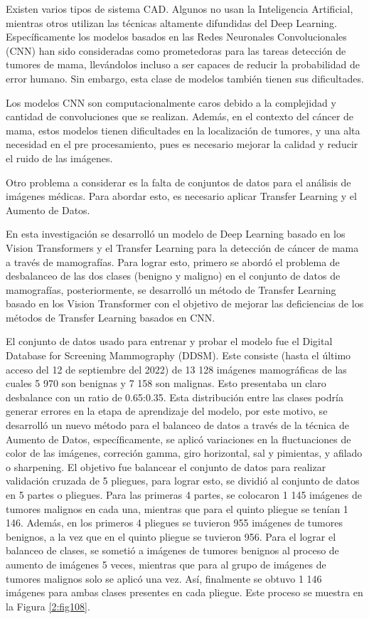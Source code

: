 Existen varios tipos de sistema CAD. Algunos no usan la Inteligencia Artificial, mientras otros utilizan las técnicas altamente difundidas del Deep Learning. Específicamente los modelos basados en las Redes Neuronales Convolucionales (CNN) han sido consideradas como prometedoras para las tareas detección de tumores de mama, llevándolos incluso a ser capaces de reducir la probabilidad de error humano. Sin embargo, esta clase de modelos también tienen sus dificultades. 

Los modelos CNN son computacionalmente caros debido a la complejidad y cantidad de convoluciones que se realizan. Además, en el contexto del cáncer de mama, estos modelos tienen dificultades en la localización de tumores, y una alta necesidad en el pre procesamiento, pues es necesario mejorar la calidad y reducir el ruido de las imágenes.

Otro problema a considerar es la falta de conjuntos de datos para el análisis de imágenes médicas. Para abordar esto, es necesario aplicar Transfer Learning y el Aumento de Datos.

En esta investigación se desarrolló un modelo de Deep Learning basado en los Vision Transformers y el Transfer Learning para la detección de cáncer de mama a través de mamografías. Para lograr esto, primero se abordó el problema de desbalanceo de las dos clases (benigno y maligno) en el conjunto de datos de mamografías, posteriormente, se desarrolló un método de Transfer Learning basado en los Vision Transformer con el objetivo de mejorar las deficiencias de los métodos de Transfer Learning basados en CNN.

El conjunto de datos usado para entrenar y probar el modelo fue el Digital Database for Screening Mammography (DDSM). Este consiste (hasta el último acceso del 12 de septiembre del 2022) de 13 128 imágenes mamográficas de las cuales 5 970 son benignas y 7 158 son malignas. Esto presentaba un claro desbalance con un ratio de 0.65:0.35. Esta distribución entre las clases podría generar errores en la etapa de aprendizaje del modelo, por este motivo, se desarrolló un nuevo método para el balanceo de datos a través de la técnica de Aumento de Datos, específicamente, se aplicó variaciones en la fluctuaciones de color de las imágenes, correción gamma, giro horizontal, sal y pimientas, y afilado o sharpening. El objetivo fue balancear el conjunto de datos para realizar validación cruzada de 5 pliegues, para lograr esto, se dividió al conjunto de datos en 5 partes o pliegues. Para las primeras 4 partes, se colocaron 1 145 imágenes de tumores malignos en cada una, mientras que para el quinto pliegue se tenían  1 146. Además, en los primeros 4 pliegues se tuvieron 955 imágenes de tumores benignos, a la vez que en el quinto pliegue se tuvieron 956. Para el lograr el balanceo de clases, se sometió a  imágenes de tumores benignos al proceso de aumento de imágenes 5 veces, mientras que para al grupo de imágenes de tumores malignos solo se aplicó una vez. Así, finalmente se obtuvo 1 146 imágenes para ambas clases presentes en cada pliegue. Este proceso se muestra en la Figura \ref{2:fig108}.


